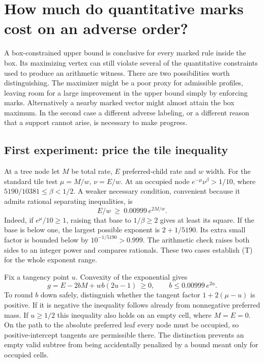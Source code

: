 \section{How much do quantitative marks cost on an adverse order?}
\label{sec:priced}
A box-constrained upper bound is conclusive for every marked rule inside the box. Its maximizing vertex can still violate several of the quantitative constraints used to produce an arithmetic witness. There are two possibilities worth distinguishing. The maximizer might be a poor proxy for admissible profiles, leaving room for a large improvement in the upper bound simply by enforcing marks. Alternatively a nearby marked vector might almost attain the box maximum. In the second case a different adverse labeling, or a different reason that a support cannot arise, is necessary to make progress.

\subsection{First experiment: price the tile inequality}
At a tree node let \(M\) be total rate, \(E\) preferred-child rate and \(w\) width. For the standard tile test \(\mu=M/w\), \(\nu=E/w\). At an occupied node \(e^{-\mu}\nu^\beta>1/10\), where \(5190/10381\le\beta<1/2\). A weaker necessary condition, convenient because it admits rational separating inequalities, is
\[
  E/w \ \ge\ 0.00999\,e^{2M/w}.                       \tag{T}
\]
Indeed, if \(e^\mu/10\ge1\), raising that base to \(1/\beta\ge2\) gives at least its square. If the base is below one, the largest possible exponent is \(2+1/5190\). Its extra small factor is bounded below by \(10^{-1/5190}>0.999\). The arithmetic check raises both sides to an integer power and compares rationals. These two cases establish (T) for the whole exponent range.

Fix a tangency point \(u\). Convexity of the exponential gives
\[
 g=E-2bM+w b(2u-1)\ \ge0,\qquad
    b\le0.00999\,e^{2u}.
\]
To round \(b\) down safely, distinguish whether the tangent factor \(1+2(\mu-u)\) is positive. If it is negative the inequality follows already from nonnegative preferred mass. If \(u\ge1/2\) this inequality also holds on an empty cell, where \(M=E=0\). On the path to the absolute preferred leaf every node must be occupied, so positive-intercept tangents are permissible there. The distinction prevents an empty valid subtree from being accidentally penalized by a bound meant only for occupied cells.

